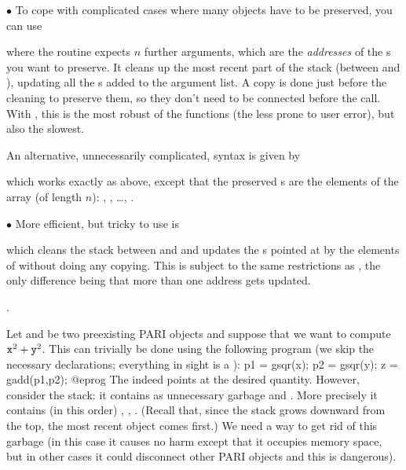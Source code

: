 \noindent$\bullet$
To cope with complicated cases where many objects have to be
preserved, you can use


\noindent where the routine expects $n$ further arguments, which are the 
\emph{addresses} of the s you want to preserve. It cleans up the most
recent part of the stack (between  and ), updating all
the s added to the argument list. A copy is done just before the
cleaning to preserve them, so they don't need to be connected before the
call. With , this is the most robust of the 
functions (the less prone to user error), but also the slowest.

An alternative, unnecessarily complicated, syntax is given by


\noindent which works exactly as above, except that the preserved s
are the elements of the array  (of length $n$): ,
, \dots, .

\noindent$\bullet$ More efficient, but tricky to use is


\noindent which cleans the stack between  and  and
updates the s pointed at by the elements of  without doing
any copying. This is subject to the same restrictions as , the
only difference being that more than one address gets updated.

.


Let  and  be two preexisting PARI objects and suppose that we
want to compute ${\tt x}^2 + {\tt y}^2$. This can trivially be done using the
following program (we skip the necessary declarations; everything in sight is
a ):
\bprog
p1 = gsqr(x);
p2 = gsqr(y); z = gadd(p1,p2);
@eprog\noindent
The   indeed points at the desired quantity. However,
consider the stack: it contains as unnecessary garbage  and .
More precisely it contains (in this order) , , .
(Recall that, since the stack grows downward from the top, the most recent
object comes first.) We need a way to get rid of this garbage (in this case
it causes no harm except that it occupies memory space, but in other cases
it could disconnect other PARI objects and this is dangerous).

